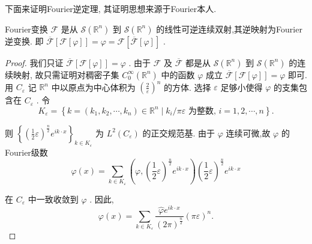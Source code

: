 \documentclass[lang=cn,newtx,10pt,scheme=chinese,thmcnt=chapter]{elegantbook}
\begin{document}
下面来证明Fourier逆定理, 其证明思想来源于Fourier本人.
\begin{theorem}
  Fourier变换 \(\mathcal{F}\) 是从 \(\mathcal{S}\left( {\mathbb{R}}^{n}\right)\) 到 \(\mathcal{S}\left( {\mathbb{R}}^{n}\right)\) 的线性可逆连续双射,其逆映射为Fourier逆变换. 即 \(\overline{\mathcal{F}}\left\lbrack  {\mathcal{F}\left\lbrack  \varphi \right\rbrack  }\right\rbrack   = \varphi  = \mathcal{F}\left\lbrack  {\overline{\mathcal{F}}\left\lbrack  \varphi \right\rbrack  }\right\rbrack\) .
\end{theorem}
\begin{proof}
  我们只证 \(\overline{\mathcal{F}}\left\lbrack  {\mathcal{F}\left\lbrack  \varphi \right\rbrack  }\right\rbrack   = \varphi\) . 由于 \(\mathcal{F}\) 及 \(\overline{\mathcal{F}}\) 都是从 \(\mathcal{S}\left( {\mathbb{R}}^{n}\right)\) 到 \(\mathcal{S}\left( {\mathbb{R}}^{n}\right)\) 的连续映射, 故只需证明对稠密子集 \({C}_{0}^{\infty }\left( {\mathbb{R}}^{n}\right)\) 中的函数 \(\varphi\) 成立 \(\overline{\mathcal{F}}\left\lbrack  {\mathcal{F}\left\lbrack  \varphi \right\rbrack  }\right\rbrack   = \varphi\) 即可. 用 \({C}_{\varepsilon }\) 记 \({\mathbb{R}}^{n}\) 中以原点为中心体积为 \({\left( \frac{2}{\varepsilon }\right) }^{n}\) 的方体. 选择 \(\varepsilon\) 足够小使得 \(\varphi\) 的支集包含在 \({C}_{\varepsilon }\) . 令
\begin{equation*}
{K}_{\varepsilon } = \left\{  {k = \left( {{k}_{1},{k}_{2},\cdots ,{k}_{n}}\right)  \in  {\mathbb{R}}^{n} \mid  {k}_{i}/{\pi \varepsilon }\text{ 为整数, }i = 1,2,\cdots ,n}\right\}  .
\end{equation*}

则 \({\left\{  {\left( \frac{1}{2}\varepsilon \right) }^{\frac{n}{2}}{e}^{{ik} \cdot  x}\right\}  }_{k \in  {K}_{\varepsilon }}\) 为 \({L}^{2}\left( {C}_{\varepsilon }\right)\) 的正交规范基. 由于 \(\varphi\) 连续可微,故 \(\varphi\) 的Fourier级数
\begin{equation}
\varphi \left( x\right)  = \mathop{\sum }\limits_{{k \in  {K}_{\varepsilon }}}\left( {\varphi ,{\left( \frac{1}{2}\varepsilon \right) }^{\frac{n}{2}}{e}^{{ik} \cdot  x}}\right) {\left( \frac{1}{2}\varepsilon \right) }^{\frac{n}{2}}{e}^{{ik} \cdot  x} \label{3.16}
\end{equation}

在 \({C}_{\varepsilon }\) 中一致收敛到 \(\varphi\) . 因此,
\begin{equation}
\varphi \left( x\right)  = \mathop{\sum }\limits_{{k \in  {K}_{\varepsilon }}}\frac{\widehat{\varphi }{e}^{{ik} \cdot  x}}{{\left( 2\pi \right) }^{\frac{n}{2}}}{\left( \pi \varepsilon \right) }^{n}. \label{3.17}
\end{equation}


\end{proof}
\end{document}
